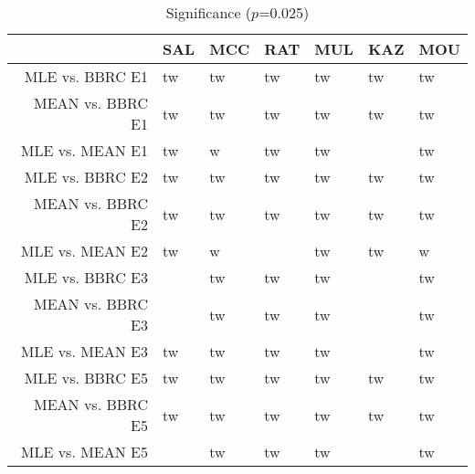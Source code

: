 \begin{table}[t]
\begin{center}
\begin{tabular}{rllllll}
  \hline
 & SAL & MCC & RAT & MUL & KAZ & MOU \\ 
  \hline
MLE vs. BBRC E1 & tw & tw & tw & tw & tw & tw \\ 
  MEAN vs. BBRC E1 & tw & tw & tw & tw & tw & tw \\ 
  MLE vs. MEAN E1 & tw & w & tw & tw &  & tw \\ 
  MLE vs. BBRC E2 & tw & tw & tw & tw & tw & tw \\ 
  MEAN vs. BBRC E2 & tw & tw & tw & tw & tw & tw \\ 
  MLE vs. MEAN E2 & tw & w &  & tw & tw & w \\ 
  MLE vs. BBRC E3 &  & tw & tw & tw &  & tw \\ 
  MEAN vs. BBRC E3 &  & tw & tw & tw &  & tw \\ 
  MLE vs. MEAN E3 & tw & tw & tw & tw &  & tw \\ 
  MLE vs. BBRC E5 & tw & tw & tw & tw & tw & tw \\ 
  MEAN vs. BBRC E5 & tw & tw & tw & tw & tw & tw \\ 
  MLE vs. MEAN E5 &  & tw & tw & tw &  & tw \\ 
   \hline
\end{tabular}
\caption{Significance ($p$=0.025)}
\label{t:sign}
\end{center}
\end{table}
